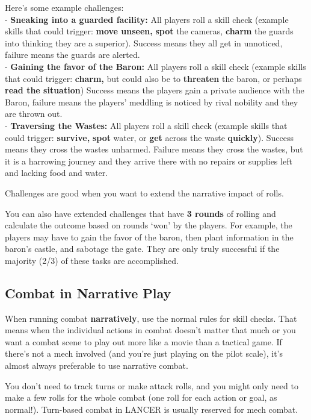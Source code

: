 Here’s some example challenges:\\
-    \textbf{Sneaking into a guarded facility:} All players roll a skill check (example skills that could trigger: \textbf{move unseen,} \textbf{spot} the cameras, \textbf{charm} the guards into thinking they are a superior). Success means they all get in unnoticed, failure means the guards are alerted.\\
-    \textbf{Gaining the favor of the Baron:} All players roll a skill check (example skills that could trigger: \textbf{charm,} but could also be to \textbf{threaten} the baron, or perhaps \textbf{read the situation}) Success means the players gain a private audience with the Baron, failure means the players’ meddling is noticed by rival nobility and they are thrown out.\\
-    \textbf{Traversing the Wastes:} All players roll a skill check (example skills that could trigger: \textbf{survive,} \textbf{spot} water, or \textbf{get} across the waste \textbf{quickly}). Success means they cross the wastes unharmed. Failure means they cross the wastes, but it is a harrowing journey and they arrive there with no repairs or supplies left and lacking food and water.

Challenges are good when you want to extend the narrative impact of rolls.

You can also have extended challenges that have \textbf{3 rounds} of rolling and calculate the outcome based on rounds ‘won’ by the players. For example, the players may have to gain the favor of the baron, then plant information in the baron’s castle, and sabotage the gate. They are only truly successful if the majority (2/3) of these tasks are accomplished.

\subsection{Combat in Narrative Play}

When running combat \textbf{narratively}, use the normal rules for skill checks. That means when the individual actions in combat doesn’t matter that much or you want a combat scene to play out more like a movie than a tactical game. If there’s not a mech involved (and you’re just playing on the pilot scale), it’s almost always preferable to use narrative combat.

You don’t need to track turns or make attack rolls, and you might only need to make a few rolls for the whole combat (one roll for each action or goal, as normal!). Turn-based combat in LANCER is usually reserved for mech combat.

